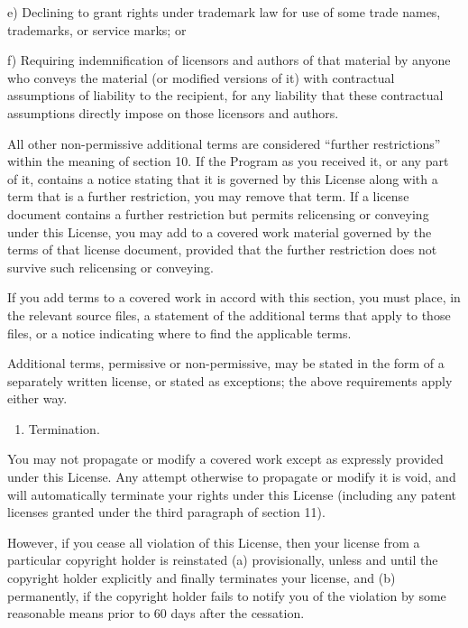 \documentclass[letterpaper,10pt,english]{sphinxmanual}
\begin{document}
e) Declining to grant rights under trademark law for use of some
trade names, trademarks, or service marks; or

f) Requiring indemnification of licensors and authors of that
material by anyone who conveys the material (or modified versions of
it) with contractual assumptions of liability to the recipient, for
any liability that these contractual assumptions directly impose on
those licensors and authors.

All other non-permissive additional terms are considered “further
restrictions” within the meaning of section 10.  If the Program as you
received it, or any part of it, contains a notice stating that it is
governed by this License along with a term that is a further
restriction, you may remove that term.  If a license document contains
a further restriction but permits relicensing or conveying under this
License, you may add to a covered work material governed by the terms
of that license document, provided that the further restriction does
not survive such relicensing or conveying.

If you add terms to a covered work in accord with this section, you
must place, in the relevant source files, a statement of the
additional terms that apply to those files, or a notice indicating
where to find the applicable terms.

Additional terms, permissive or non-permissive, may be stated in the
form of a separately written license, or stated as exceptions;
the above requirements apply either way.
\begin{enumerate}
%
\setcounter{enumi}{7}
\item {} 
Termination.

\end{enumerate}

You may not propagate or modify a covered work except as expressly
provided under this License.  Any attempt otherwise to propagate or
modify it is void, and will automatically terminate your rights under
this License (including any patent licenses granted under the third
paragraph of section 11).

However, if you cease all violation of this License, then your
license from a particular copyright holder is reinstated (a)
provisionally, unless and until the copyright holder explicitly and
finally terminates your license, and (b) permanently, if the copyright
holder fails to notify you of the violation by some reasonable means
prior to 60 days after the cessation.
\end{document}

